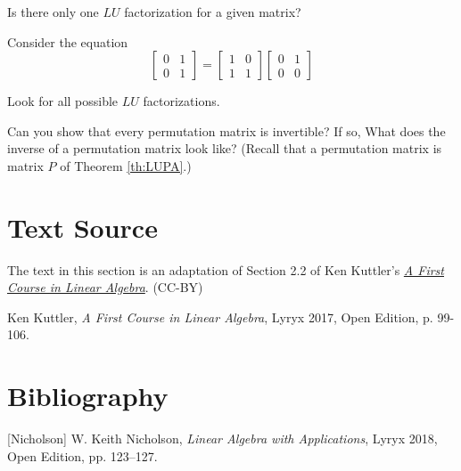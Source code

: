 \documentclass{ximera}
\begin{document}
\begin{problem}\label{prob:LU4}
Is there only one $LU$ factorization for a given matrix?

\begin{hint}Consider the equation
$$
\begin{bmatrix}0 & 1 \\0 & 1\end{bmatrix}=\begin{bmatrix}1& 0 \\1 & 1\end{bmatrix} \begin{bmatrix}0 & 1 \\0 & 0\end{bmatrix}
$$

Look for all possible $LU$ factorizations.
\end{hint}
\end{problem}

\begin{problem}\label{prob:LU5}
Can you show that every permutation matrix is invertible?  If so, What does the inverse of a permutation matrix look like? (Recall that a permutation matrix is matrix $P$ of Theorem \ref{th:LUPA}.)
\end{problem}

\section*{Text Source}
The text in this section is an adaptation of Section 2.2 of Ken Kuttler's \href{https://open.umn.edu/opentextbooks/textbooks/a-first-course-in-linear-algebra-2017}{\it A First Course in Linear Algebra}. (CC-BY)

Ken Kuttler, {\it  A First Course in Linear Algebra}, Lyryx 2017, Open Edition, p. 99-106.

\section*{Bibliography}

[Nicholson] W. Keith Nicholson, {\it Linear Algebra with Applications}, Lyryx 2018, Open Edition, pp. 123--127.
\end{document}
